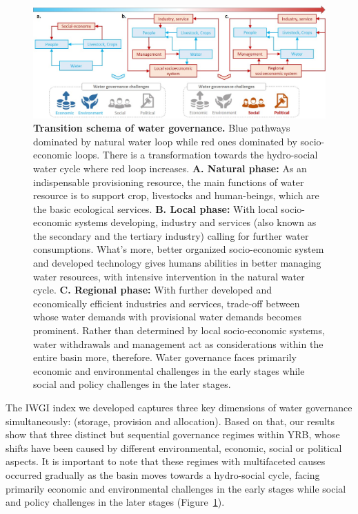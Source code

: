 \documentclass[9pt, twocolumn, twoside, lineno]{pnas-new}
\begin{document}
\begin{figure}[htbp!]
	\centering
	\includegraphics[width=\linewidth]{../../figures/main/transition.jpg}
	\caption{
		\textbf{Transition schema of water governance.} Blue pathways dominated by natural water loop while red ones dominated by socio-economic loops. There is a transformation towards the hydro-social water cycle where red loop increases.
		\textbf{A. Natural phase:} As an indispensable provisioning resource, the main functions of water resource is to support crop, livestocks and human-beings, which are the basic ecological services.
		\textbf{B. Local phase:} With local socio-economic systems developing, industry and services (also known as the secondary and the tertiary industry) calling for further water consumptions. What's more, better organized socio-economic system and developed technology gives humans abilities in better managing water resources, with intensive intervention in the natural water cycle. 
		\textbf{C. Regional phase:} With further developed and economically efficient industries and services, trade-off between whose water demands with provisional water demands becomes prominent. Rather than determined by local socio-economic systems, water withdrawals and management act as considerations within the entire basin more, therefore. 
		Water governance faces primarily economic and environmental challenges in the early stages while social and policy challenges in the later stages.
	}
	\label{fig:summary}
\end{figure}

The IWGI index we developed captures three key dimensions of water governance simultaneously: (storage, provision and allocation). 
Based on that, our results show that three distinct but sequential governance regimes within YRB, whose shifts have been caused by different environmental, economic, social or political aspects.
It is important to note that these regimes with multifaceted causes occurred gradually as the basin moves towards a hydro-social cycle, facing primarily economic and environmental challenges in the early stages while social and policy challenges in the later stages (Figure~\ref{fig:summary}).
\end{document}
